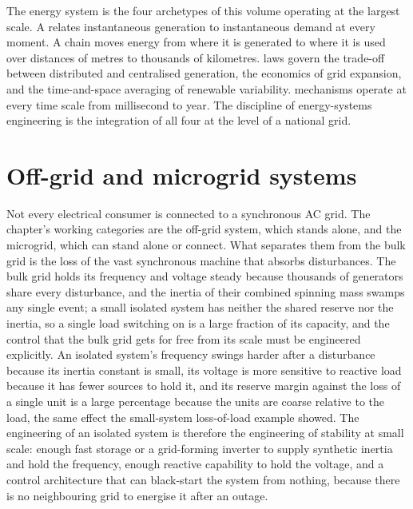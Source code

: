 \begin{archetype}
The energy system is the four archetypes of this volume operating at
the largest scale. A  relates instantaneous
generation to instantaneous demand at every moment. A
 chain moves energy from where it is generated
to where it is used over distances of metres to thousands of
kilometres.  laws govern the trade-off between
distributed and centralised generation, the economics of grid
expansion, and the time-and-space averaging of renewable variability.
 mechanisms operate at every time scale from
millisecond to year. The discipline of energy-systems engineering is
the integration of all four at the level of a national grid.
\end{archetype}

\section{Off-grid and microgrid systems}

Not every electrical consumer is connected to a synchronous AC grid.
The chapter's working categories are the off-grid system, which stands alone,
and the microgrid, which can stand alone or connect. What separates them from
the bulk grid is the loss of the vast synchronous machine that absorbs
disturbances. The bulk grid holds its frequency and voltage steady because
thousands of generators share every disturbance, and the inertia of their
combined spinning mass swamps any single event; a small isolated system has
neither the shared reserve nor the inertia, so a single load switching on is a
large fraction of its capacity, and the control that the bulk grid gets for
free from its scale must be engineered explicitly. An isolated system's
frequency swings harder after a disturbance because its inertia constant is
small, its voltage is more sensitive to reactive load because it has fewer
sources to hold it, and its reserve margin against the loss of a single unit is
a large percentage because the units are coarse relative to the load, the same
effect the small-system loss-of-load example showed. The engineering of an
isolated system is therefore the engineering of stability at small scale:
enough fast storage or a grid-forming inverter to supply synthetic inertia and
hold the frequency, enough reactive capability to hold the voltage, and a
control architecture that can black-start the system from nothing, because
there is no neighbouring grid to energise it after an outage.

